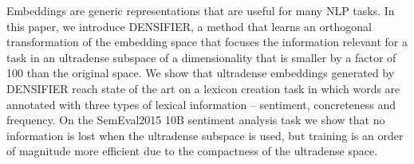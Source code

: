 Embeddings are generic representations that are useful for many NLP tasks. In this paper, we introduce DENSIFIER, a method that learns an orthogonal transformation of the embedding space that focuses the information relevant for a task in an ultradense subspace of a dimensionality that is smaller by a factor of 100 than the original space. We show that ultradense embeddings generated by DENSIFIER reach state of the art on a lexicon creation task in which words are annotated with three types of lexical information -- sentiment, concreteness and frequency. On the SemEval2015 10B sentiment analysis task we show that no information is lost when the ultradense subspace is used, but training is an order of magnitude more efficient due to the compactness of the ultradense space.
